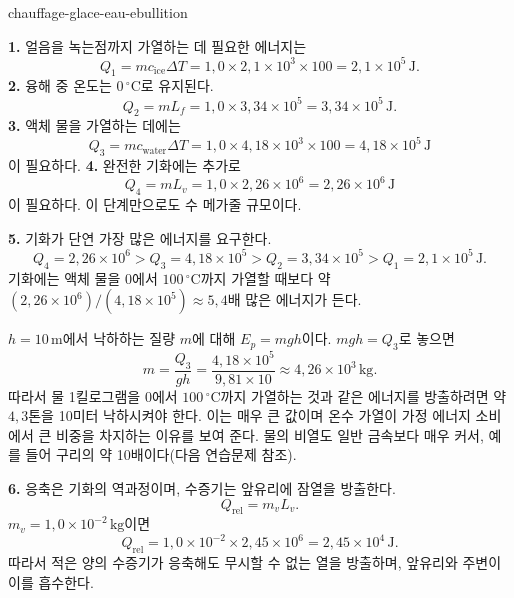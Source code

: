 \begin{exo}{chauffage-glace-eau-ebullition}
\begin{solution}
\textbf{1.} 얼음을 녹는점까지 가열하는 데 필요한 에너지는
\[
Q_1=mc_{\text{ice}}\Delta T
=1{,}0\times2{,}1\times10^3\times100=2{,}1\times10^5\,\text{J}.
\]
\textbf{2.} 융해 중 온도는 $0\,{}^\circ\text{C}$로 유지된다.
\[
Q_2=mL_f=1{,}0\times3{,}34\times10^5=3{,}34\times10^5\,\text{J}.
\]
\textbf{3.} 액체 물을 가열하는 데에는
\[
Q_3=mc_{\text{water}}\Delta T
=1{,}0\times4{,}18\times10^3\times100=4{,}18\times10^5\,\text{J}
\]
이 필요하다.
\textbf{4.} 완전한 기화에는 추가로
\[
Q_4=mL_v=1{,}0\times2{,}26\times10^6=2{,}26\times10^6\,\text{J}
\]
이 필요하다. 이 단계만으로도 수 메가줄 규모이다.

\textbf{5.} 기화가 단연 가장 많은 에너지를 요구한다.
\[
Q_4=2{,}26\times10^6>Q_3=4{,}18\times10^5>Q_2=3{,}34\times10^5>Q_1=2{,}1\times10^5\,\text{J}.
\]
기화에는 액체 물을 $0$에서 $100\,{}^\circ\text{C}$까지 가열할 때보다 약 $(2{,}26\times10^6)/(4{,}18\times10^5)\approx5{,}4$배 많은 에너지가 든다.

$h=10\,\text{m}$에서 낙하하는 질량 $m$에 대해 $E_p=mgh$이다. $mgh=Q_3$로 놓으면
\[
m=\frac{Q_3}{gh}=\frac{4{,}18\times10^5}{9{,}81\times10}
\approx4{,}26\times10^3\,\text{kg}.
\]
따라서 물 1킬로그램을 $0$에서 $100\,{}^\circ\text{C}$까지 가열하는 것과 같은 에너지를 방출하려면 약 $4{,}3$톤을 10미터 낙하시켜야 한다. 이는 매우 큰 값이며 온수 가열이 가정 에너지 소비에서 큰 비중을 차지하는 이유를 보여 준다. 물의 비열도 일반 금속보다 매우 커서, 예를 들어 구리의 약 10배이다(다음 연습문제 참조).

\textbf{6.} 응축은 기화의 역과정이며, 수증기는 앞유리에 잠열을 방출한다.
\[
Q_{\text{rel}}=m_vL_v.
\]
$m_v=1{,}0\times10^{-2}\,\text{kg}$이면
\[
Q_{\text{rel}}=1{,}0\times10^{-2}\times2{,}45\times10^6
=2{,}45\times10^4\,\text{J}.
\]
따라서 적은 양의 수증기가 응축해도 무시할 수 없는 열을 방출하며, 앞유리와 주변이 이를 흡수한다.
\end{solution}
\end{exo}


